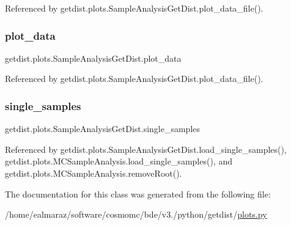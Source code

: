 Referenced by getdist.\+plots.\+Sample\+Analysis\+Get\+Dist.\+plot\+\_\+data\+\_\+file().

\mbox{\label{classgetdist_1_1plots_1_1SampleAnalysisGetDist_a3ab4d1fcd749ff45996919a28ff26929}} 
\subsubsection{\texorpdfstring{plot\+\_\+data}{plot\_data}}
{\footnotesize\ttfamily getdist.\+plots.\+Sample\+Analysis\+Get\+Dist.\+plot\+\_\+data}



Referenced by getdist.\+plots.\+Sample\+Analysis\+Get\+Dist.\+plot\+\_\+data\+\_\+file().

\mbox{\label{classgetdist_1_1plots_1_1SampleAnalysisGetDist_ab0d2e2e44789d9e1916aab1b18590c96}} 
\subsubsection{\texorpdfstring{single\+\_\+samples}{single\_samples}}
{\footnotesize\ttfamily getdist.\+plots.\+Sample\+Analysis\+Get\+Dist.\+single\+\_\+samples}



Referenced by getdist.\+plots.\+Sample\+Analysis\+Get\+Dist.\+load\+\_\+single\+\_\+samples(), getdist.\+plots.\+M\+C\+Sample\+Analysis.\+load\+\_\+single\+\_\+samples(), and getdist.\+plots.\+M\+C\+Sample\+Analysis.\+remove\+Root().



The documentation for this class was generated from the following file\+:\begin{DoxyCompactItemize}
\item 
/home/ealmaraz/software/cosmomc/bde/v3./python/getdist/\mbox{\hyperlink{plots_8py}{plots.\+py}}\end{DoxyCompactItemize}
